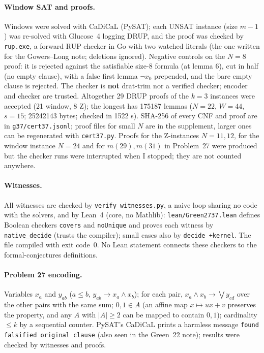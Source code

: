 \documentclass[11pt]{article}
\begin{document}
\paragraph{Window SAT and proofs.} Windows were solved with CaDiCaL (PySAT); each UNSAT instance (size $m-1$) was re-solved with Glucose~4 logging DRUP, and the proof was checked by \texttt{rup.exe}, a forward RUP checker in Go with two watched literals (the one written for the Gowers--Long note; deletions ignored). Negative controls on the $N=8$ proof: it is rejected against the satisfiable size-$8$ formula (at lemma 6), cut in half (no empty clause), with a false first lemma $\neg x_0$ prepended, and the bare empty clause is rejected. The checker is \textbf{not} drat-trim nor a verified checker; encoder and checker are trusted. Altogether 29 DRUP proofs of the $k=3$ instances were accepted (21 window, 8 Z); the longest has 175187 lemmas ($N=22$, $W=44$, $s=15$; 25242143 bytes; checked in 1522 s). SHA-256 of every CNF and proof are in \texttt{g37/cert37.jsonl}; proof files for small $N$ are in the supplement, larger ones can be regenerated with \texttt{cert37.py}. Proofs for the Z-instances $N=11,12$, for the window instance $N=24$ and for $m(29),m(31)$ in Problem~27 were produced but the checker runs were interrupted when I stopped; they are not counted anywhere.

\paragraph{Witnesses.} All witnesses are checked by \texttt{verify\_witnesses.py}, a naive loop sharing no code with the solvers, and by Lean~4 (core, no Mathlib): \texttt{lean/Green2737.lean} defines Boolean checkers \texttt{covers} and \texttt{noUnique} and proves each witness by \texttt{native\_decide} (trusts the compiler); small cases also by \texttt{decide +kernel}. The file compiled with exit code~0. No Lean statement connects these checkers to the formal-conjectures definitions.

\paragraph{Problem 27 encoding.} Variables $x_a$ and $y_{ab}$ ($a\le b$, $y_{ab}\to x_a\wedge x_b$); for each pair, $x_a\wedge x_b\to\bigvee y_{cd}$ over the other pairs with the same sum; $0,1\in A$ (an affine map $x\mapsto ux+v$ preserves the property, and any $A$ with $|A|\ge2$ can be mapped to contain $0,1$); cardinality $\le k$ by a sequential counter. PySAT's CaDiCaL prints a harmless message \texttt{found falsified original clause} (also seen in the Green~22 note); results were checked by witnesses and proofs.
\end{document}
